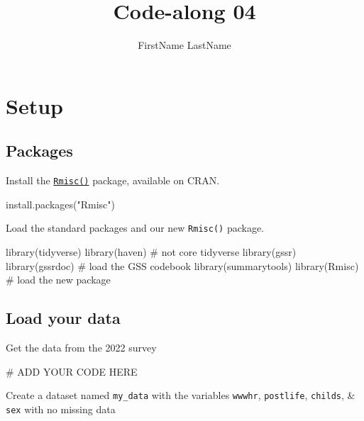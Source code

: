 \documentclass[
  letterpaper,
  DIV=11,
  numbers=noendperiod]{scrartcl}
\title{Code-along 04}
\author{FirstName LastName}
\date{}
\newenvironment{Shaded}{\begin{snugshade}}{\end{snugshade}}
\newcommand{\CommentTok}[1]{\textcolor[rgb]{0.37,0.37,0.37}{#1}}
\newcommand{\FunctionTok}[1]{\textcolor[rgb]{0.28,0.35,0.67}{#1}}
\newcommand{\NormalTok}[1]{\textcolor[rgb]{0.00,0.23,0.31}{#1}}
\newcommand{\StringTok}[1]{\textcolor[rgb]{0.13,0.47,0.30}{#1}}
\begin{document}
\maketitle


\section{Setup}\label{setup}

\subsection{Packages}\label{packages}

Install the
\href{https://cran.r-project.org/web/packages/Rmisc/refman/Rmisc.html}{\texttt{Rmisc()}}
package, available on CRAN.

\begin{Shaded}
\begin{Highlighting}[]
\FunctionTok{install.packages}\NormalTok{(}\StringTok{"Rmisc"}\NormalTok{)}
\end{Highlighting}
\end{Shaded}

Load the standard packages and our new \texttt{Rmisc()} package.

\begin{Shaded}
\begin{Highlighting}[]
\FunctionTok{library}\NormalTok{(tidyverse)}
\FunctionTok{library}\NormalTok{(haven) }\CommentTok{\# not core tidyverse}
\FunctionTok{library}\NormalTok{(gssr)}
\FunctionTok{library}\NormalTok{(gssrdoc) }\CommentTok{\# load the GSS codebook}
\FunctionTok{library}\NormalTok{(summarytools)}
\FunctionTok{library}\NormalTok{(Rmisc) }\CommentTok{\# load the new package}
\end{Highlighting}
\end{Shaded}

\subsection{Load your data}\label{load-your-data}

Get the data from the 2022 survey

\begin{Shaded}
\begin{Highlighting}[]
\CommentTok{\# ADD YOUR CODE HERE}
\end{Highlighting}
\end{Shaded}

Create a dataset named \texttt{my\_data} with the variables
\texttt{wwwhr}, \texttt{postlife}, \texttt{childs}, \& \texttt{sex} with
no missing data
\end{document}
